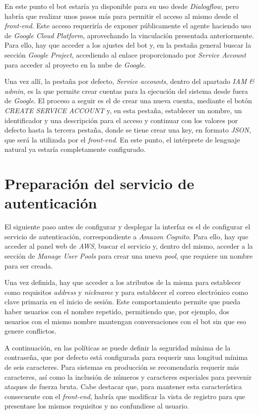 \documentclass[11pt,spanish,listoffigures]{tfgetsinf}
\begin{document}
En este punto el bot estaría ya disponible para su uso desde \textit{Dialogflow}, pero habría que realizar unos pasos más para permitir el acceso al mismo desde el \textit{front-end}. Este acceso requeriría de exponer públicamente el agente haciendo uso de \textit{Google Cloud Platform}, aprovechando la vinculación presentada anteriormente. Para ello, hay que acceder a los ajustes del bot y, en la pestaña general buscar la sección \textit{Google Project}, accediendo al enlace proporcionado por \textit{Service Account} para acceder al proyecto en la nube de \textit{Google}.

Una vez allí, la pestaña por defecto, \textit{Service accounts}, dentro del apartado \textit{IAM \& admin}, es la que permite crear cuentas para la ejecución del sistema desde fuera de \textit{Google}. El proceso a seguir es el de crear una nueva cuenta, mediante el botón \textit{CREATE SERVICE ACCOUNT} y, en esta pestaña, establecer un nombre, un identificador y una descripción para el acceso y continuar con los valores por defecto hasta la tercera pestaña, donde se tiene crear una key, en formato \textit{JSON}, que será la utilizada por el \textit{front-end}. En este punto, el intérprete de lenguaje natural ya estaría completamente configurado.

\section{Preparación del servicio de autenticación}
\label{sec:implantacion-cognito}

El siguiente paso antes de configurar y desplegar la interfaz es el de configurar el servicio de autenticación, correspondiente a \textit{Amazon Cognito}. Para ello, hay que acceder al panel web de \textit{AWS}, buscar el servicio y, dentro del mismo, acceder a la sección de \textit{Manage User Pools} para crear una nueva \textit{pool}, que requiere un nombre para ser creada. 

Una vez definida, hay que acceder a los atributos de la misma para establecer como requisitos \textit{address} y \textit{nickname} y para establecer el correo electrónico como clave primaria en el inicio de sesión. Este comportamiento permite que pueda haber usuarios con el nombre repetido, permitiendo que, por ejemplo, dos usuarios con el mismo nombre mantengan conversaciones con el bot sin que eso genere conflictos.

A continuación, en las políticas se puede definir la seguridad mínima de la contraseña, que por defecto está configurada para requerir una longitud mínima de seis caracteres. Para sistemas en producción se recomendaría requerir más caracteres, así como la inclusión de números y caracteres especiales para prevenir ataques de fuerza bruta. Cabe destacar que, para mantener esta característica consecuente con el \textit{front-end}, habría que modificar la vista de registro para que presentase los mismos requisitos y no confundiese al usuario.
\end{document}
